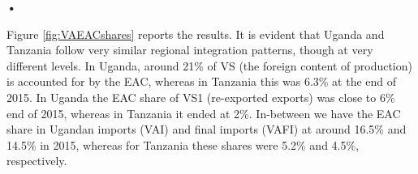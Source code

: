 \textbf{\textbf{•}}\documentclass[a4paper]{article}
\begin{document}
%
%
%
%
%

Figure \ref{fig:VAEACshares} reports the results. It is evident that Uganda and Tanzania follow very similar regional integration patterns, though at very different levels. In Uganda, around 21\% of VS (the foreign content of production) is accounted for by the EAC, whereas in Tanzania this was 6.3\% at the end of 2015. In Uganda the EAC share of VS1 (re-exported exports) was close to 6\% end of 2015, whereas in Tanzania it ended at 2\%. In-between we have the EAC share in Ugandan imports (VAI) and final imports (VAFI) at around 16.5\% and 14.5\% in 2015, whereas for Tanzania these shares were 5.2\% and 4.5\%, respectively. 

\end{document}
